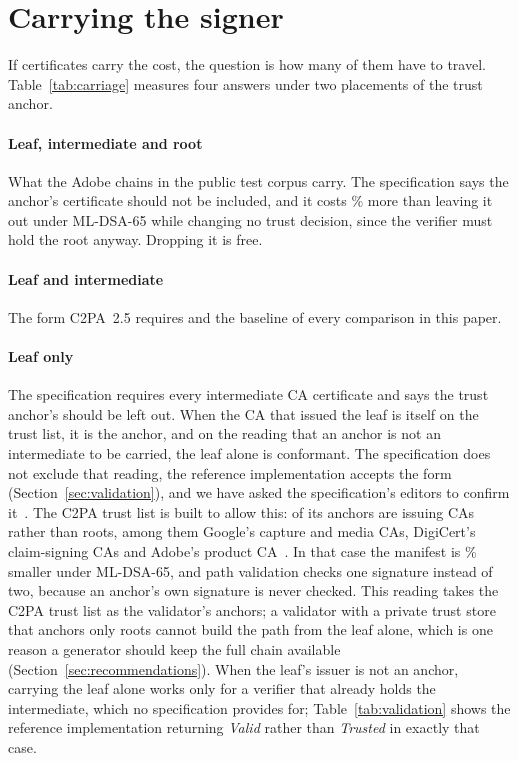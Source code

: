 \section{Carrying the signer}
\label{sec:carrying}

If certificates carry the cost, the question is how many of them have to
travel. Table~\ref{tab:carriage} measures four answers under two placements
of the trust anchor.



\paragraph{Leaf, intermediate and root} What the Adobe chains in the public
test corpus carry. The specification says the anchor's certificate should not
be included, and it costs \NcostRootDSAsixtyfive\% more than leaving it out
under ML-DSA-65 while changing no trust decision, since the verifier must
hold the root anyway. Dropping it is free.

\paragraph{Leaf and intermediate} The form C2PA~2.5 requires and the baseline
of every comparison in this paper.

\paragraph{Leaf only} The specification requires every intermediate CA certificate and says the trust anchor's should be left out. When the CA that issued the
leaf is itself on the trust list, it is the anchor, and on the reading that
an anchor is not an intermediate to be carried, the leaf alone is
conformant. The specification does not exclude that reading, the reference
implementation accepts the form (Section~\ref{sec:validation}), and we have
asked the specification's editors to confirm it~\cite{c2paspec142}. The C2PA trust list is
built to allow this: \NtlIssuing{} of its \NtlAnchors{} anchors are issuing
CAs rather than roots, among them Google's capture and media CAs, DigiCert's
claim-signing CAs and Adobe's product CA~\cite{c2patrustlist}. In that case
the manifest is \NsaveLeafDSAsixtyfive\% smaller under ML-DSA-65, and path
validation checks one signature instead of two, because an anchor's own
signature is never checked. This reading takes the C2PA trust list as the
validator's anchors; a validator with a private trust store that anchors only
roots cannot build the path from the leaf alone, which is one reason a
generator should keep the full chain available (Section~\ref{sec:recommendations}).
When the leaf's issuer is not an anchor, carrying
the leaf alone works only for a verifier that already holds the intermediate,
which no specification provides for; Table~\ref{tab:validation} shows the
reference implementation returning \emph{Valid} rather than \emph{Trusted} in
exactly that case.

